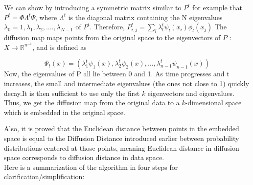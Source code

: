 We can show by introducing a symmetric matrix similar to $P^t$ for example that $P^{t}=\Phi \Lambda^t \Psi$, where $\Lambda^t$ is the diagonal matrix containing the N eigenvalues $\lambda_0=1, \lambda_1, \lambda_2, ...., \lambda_{N-1}$ of $P^{t}$.
Therefore, $P_{i,j}^{t} = \sum_{l} \lambda_{l}^{t} \psi_{l}(x_{i}) \phi_{l}(x_{j})$
The diffusion map maps points from the original space to the eigenvectors of $P$ : \( X \mapsto \mathbb{R}^{n^{-1}} \), and is defined as

\[
\Psi_{t}(x) = (\lambda_{1}^{t}\psi_{1}(x), \lambda_{2}^{t}\psi_{2}(x), \ldots, \lambda_{n-1}^{t}\psi_{n-1}(x))
\]
Now, the eigenvalues of P all lie between 0 and 1. As time progresses and t increases, the small and intermediate eigenvalues (the ones not close to 1) quickly decay.It is then sufficient to use only the first \( k \) eigenvectors and eigenvalues. Thus, we get the diffusion map from the original data to a \( k \)-dimensional space which is embedded in the original space.

%
Also, it is proved that the Euclidean distance between points in the embedded space is equal to the Diffusion Distance introduced earlier between probability distributions centered at those points, meaning Euclidean distance in diffusion space corresponds to diffusion distance in data space.
\\


Here is a summarization of the algorithm in four steps for clarification/simplification:

